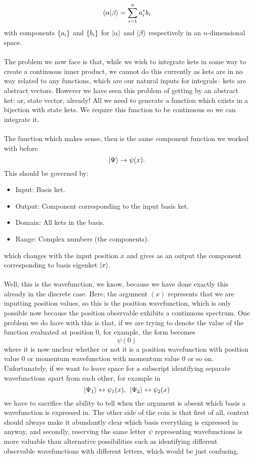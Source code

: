 $$
\langle\alpha|\beta\rangle=\sum_{i=1}^{n}a^{\ast}_{i}b_{i}
$$
with components $\{a_{i}\}$ and $\{b_{i}\}$ for $|\alpha\rangle$ and $|\beta\rangle$ respectively in an $n$-dimensional space.
\\\\
The problem we now face is that, while we wish to integrate kets in some way to create a continuous inner product, we cannot do this currently as kets are in no way related to any functions, which are our natural inputs for integrals-- kets are abstract vectors. However we have seen this problem of getting by an abstract ket: or, state vector, already! All we need to generate a function which exists in a bijection with state kets. We require this function to be continuous so we can integrate it.
\\\\
The function which makes sense, then is the same component function we worked with before
$$
|\Psi\rangle\to \psi(x).
$$
This should be governed by:
\begin{itemize}
    \item Input: Basis ket.
    \item Output: Component corresponding to the input basis ket.
    \item Domain: All kets in the basis.
    \item Range: Complex numbers (the components).
\end{itemize}
which changes with the input position $x$ and gives as an output the component corresponding to basis eigenket $|x\rangle$. 
\\\\
Well, this is the wavefunction, we know, because we have done exactly this already in the discrete case. Here, the argument $(x)$ represents that we are inputting position values, so this is the position wavefunction, which is only possible now because the position observable exhibits a continuous spectrum. One problem we do have with this is that, if we are trying to denote the value of the function evaluated at position $0$, for example, the form becomes
$$
\psi(0)
$$
 where it is now unclear whether or not it is a position wavefunction with position value $0$ or momentum wavefunction with momentum value $0$ or so on. Unfortunately, if we want to leave space for a subscript identifying separate wavefunctions apart from each other, for example in 
$$
|\Psi_{1}\rangle\leftrightarrow\psi_{1}(x),\:\: |\Psi_{2}\rangle\leftrightarrow \psi_{2}(x)
$$
we have to sacrifice the ability to tell when the argument is absent which basis a wavefunction is expressed in. The other side of the coin is that first of all, context should always make it abundantly clear which basis everything is expressed in anyway, and secondly, reserving the same letter $\psi$ representing wavefunctions is more valuable than alternative possibilities such as identifying different observable wavefunctions with different letters, which would be just confusing.
